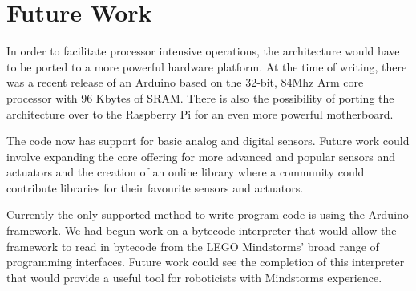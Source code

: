 \section{Future Work}
In order to facilitate processor intensive operations, the architecture would have to be ported to a more powerful hardware platform. At the time of writing, there was a recent release of an Arduino based on the 32-bit, 84Mhz Arm core processor with 96 Kbytes of SRAM. There is also the possibility of porting the architecture over to the Raspberry Pi for an even more powerful motherboard.

The code now has support for basic analog and digital sensors. Future work could involve expanding the core offering for more advanced and popular sensors and actuators and the creation of an online library where a community could contribute libraries for their favourite sensors and actuators.

Currently the only supported method to write program code is using the Arduino framework. We had begun work on a bytecode interpreter that would allow the \xten framework to read in bytecode from the LEGO Mindstorms' broad range of programming interfaces. Future work could see the completion of this interpreter that would provide a useful tool for roboticists with Mindstorms experience.
